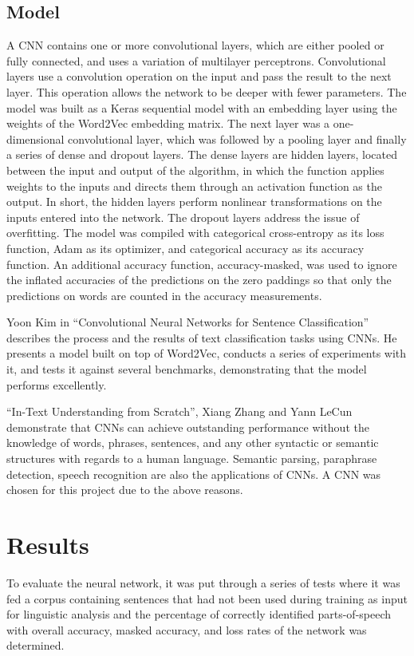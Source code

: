 \documentclass[conference]{IEEEtran}
\begin{document}
\subsection{Model}
    A CNN contains one or more convolutional layers, which are either pooled or fully connected, and uses a variation of multilayer perceptrons. Convolutional layers use a convolution operation on the input and pass the result to the next layer. This operation allows the network to be deeper with fewer parameters. The model was built as a Keras sequential model with an embedding layer using the weights of the Word2Vec embedding matrix. The next layer was a one-dimensional convolutional layer, which was followed by a pooling layer and finally a series of dense and dropout layers. The dense layers are  hidden layers, located between the input and output of the algorithm, in which the function applies weights to the inputs and directs them through an activation function as the output. In short, the hidden layers perform nonlinear transformations on the inputs entered into the network\cite{b14}. The dropout layers address the issue of overfitting. The model was compiled with categorical cross-entropy as its loss function, Adam as its optimizer, and categorical accuracy as its accuracy function. An additional accuracy function, accuracy-masked, was used to ignore the inflated accuracies of the predictions on the zero paddings so that  only the predictions on words are counted in the accuracy measurements\cite{b16}.
    
    Yoon Kim in “Convolutional Neural Networks for Sentence Classification” describes the process and the results of text classification tasks using CNNs. He presents a model built on top of Word2Vec, conducts a series of experiments with it, and tests it against several benchmarks, demonstrating that the model performs excellently\cite{b10}\cite{b5}.
    
    “In-Text Understanding from Scratch”, Xiang Zhang and Yann LeCun demonstrate that CNNs can achieve outstanding performance without the knowledge of words, phrases, sentences, and any other syntactic or semantic structures with regards to a human language\cite{b11}\cite{b6}. Semantic parsing, paraphrase detection, speech recognition are also the applications of CNNs\cite{b9}\cite{b8}. A CNN was chosen for this project due to the above reasons.
    


\section{Results}
To evaluate the neural network, it was put through a series of tests where it was fed a corpus containing sentences that had not been used during training as input for linguistic analysis and the percentage of correctly identified parts-of-speech with overall accuracy, masked accuracy, and loss rates of the network was determined. 
\end{document}
